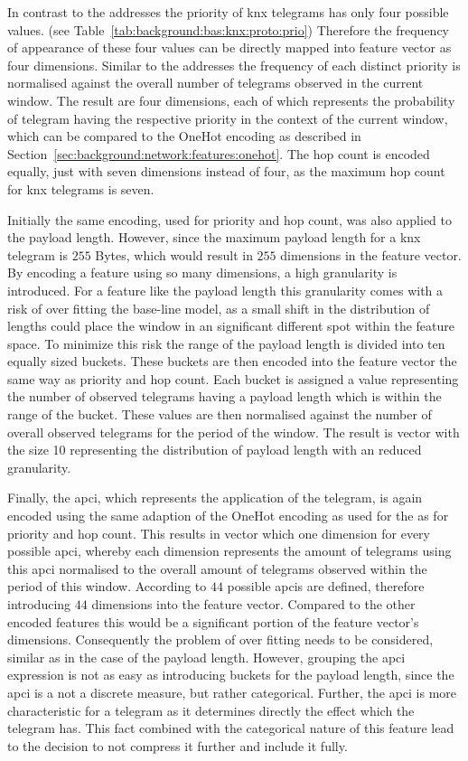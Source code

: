In contrast to the addresses the priority of \gls{knx} telegrams has only four possible values. (see Table~\ref{tab:background:bas:knx:proto:prio}) Therefore the frequency of appearance of these four values can be directly mapped into feature vector as four dimensions. Similar to the addresses the frequency of each distinct priority is normalised against the overall number of telegrams observed in the current window.
The result are four dimensions, each of which represents the probability of telegram having the respective priority in the context of the current window, which can be compared to the OneHot encoding as described in Section~\ref{sec:background:network:features:onehot}.
The hop count is encoded equally, just with seven dimensions instead of four, as the maximum hop count for \gls{knx} telegrams is seven.

Initially the same encoding, used for priority and hop count, was also applied to the payload length. However, since the maximum payload length for a \gls{knx} telegram is $255$ Bytes, which would result in $255$ dimensions in the feature vector.
By encoding a feature using so many dimensions, a high granularity is introduced. For a feature like the payload length this granularity comes with a risk of over fitting the base-line model, as a small shift in the distribution of lengths could place the window in an significant different spot within the feature space.
To minimize this risk the range of the payload length is divided into ten equally sized buckets. These buckets are then encoded into the feature vector the same way as priority and hop count.
Each bucket is assigned a value representing the number of observed telegrams having a payload length which is within the range of the bucket. These values are then normalised against the number of overall observed telegrams for the period of the window.
The result is vector with the size 10 representing the distribution of payload length with an reduced granularity.

Finally, the \gls{apci}, which represents the application of the telegram, is again encoded using the same adaption of the OneHot encoding as used for the as for priority and hop count. This results in vector which one dimension for every possible \gls{apci}, whereby each dimension represents the amount of telegrams using this \gls{apci} normalised to the overall amount of telegrams observed within the period of this window.
According to \textcite{DIN_EN_50090-4-1} $44$ possible \glspl{apci} are defined, therefore introducing $44$ dimensions into the feature vector.
Compared to the other encoded features this would be a significant portion of the feature vector's dimensions. Consequently the problem of over fitting needs to be considered, similar as in the case of the payload length.
However, grouping the \gls{apci} expression is not as easy as introducing buckets for the payload length, since the \gls{apci} is a 
not a discrete measure, but rather categorical. Further, the \gls{apci} is more characteristic for a telegram as it determines directly the effect which the telegram has.
This fact combined with the categorical nature of this feature lead to the decision to not compress it further and include it fully.

